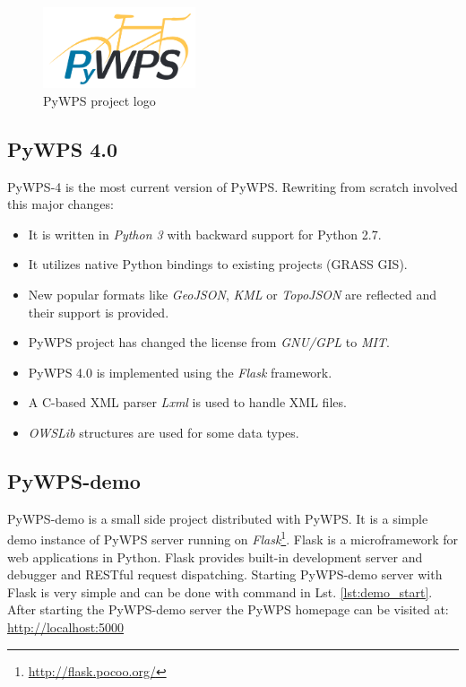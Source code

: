 \documentclass[12pt,a4paper]{article}
\begin{document}
\begin{figure}[h!]
\centering
\includegraphics[width=0.4\textwidth]{img/pywps_logo.png}
\caption{PyWPS project logo}
\label{fig:pywps_logo}
\end{figure}

\subsection{PyWPS 4.0}
\label{sec:PyWPS4}
PyWPS-4 is the most current version of PyWPS. Rewriting from scratch involved this major changes:
\begin{itemize}
\item It is written in \textit{Python 3} with backward support for Python 2.7.
\item It utilizes native Python bindings to existing projects (GRASS GIS).
\item New popular formats like \textit{GeoJSON}, \textit{KML} or \textit{TopoJSON} are reflected and their support is provided.
\item PyWPS project has changed the license from \textit{GNU/GPL} to \textit{MIT}.
\item PyWPS 4.0 is implemented using the \textit{Flask} framework.
\item A C-based XML parser \textit{Lxml} is used to handle XML files.
\item \textit{OWSLib} structures are used for some data types.
\end{itemize}

\subsection{PyWPS-demo}
\label{sub:demo}
PyWPS-demo is a small side project distributed with PyWPS. It is a simple demo instance of PyWPS server running on 
\textit{Flask}\footnote{\url{http://flask.pocoo.org/}}. Flask is a microframework for web applications in Python. 
Flask provides built-in development server and debugger and RESTful request dispatching. Starting PyWPS-demo server with Flask
is very simple and can be done with command in Lst. \ref{lst:demo_start}. After starting the PyWPS-demo server the PyWPS homepage can be 
visited at: \url{http://localhost:5000}
\end{document}
